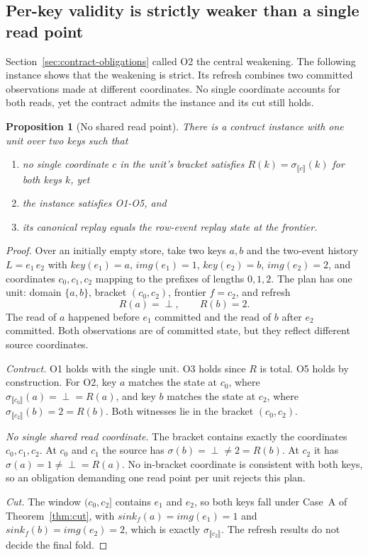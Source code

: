 \documentclass[sigconf,nonacm,10pt]{acmart}
\theoremstyle{plain}
\newtheorem{proposition}{Proposition}
\theoremstyle{definition}
\newcommand{\den}[1]{\llbracket #1 \rrbracket}   %
\newcommand{\window}[2]{(#1,#2]}                 %
\newcommand{\keyof}{\mathit{key}}                %
\newcommand{\imgof}{\mathit{img}}                %
\newcommand{\sink}{\mathit{sink}}                %
\begin{document}
\subsection{Per-key validity is strictly weaker than a single read
point}\label{sec:theorem-torn}

Section~\ref{sec:contract-obligations} called O2 the central weakening. The
following instance shows that the weakening is strict. Its refresh
combines two committed observations made at different coordinates. No
single coordinate accounts for both reads, yet the contract admits
the instance and its cut still holds.

\begin{proposition}[No shared read point]\label{prop:torn}
There is a contract instance with one unit over two keys such that
\begin{enumerate}
\item no single coordinate $c$ in the unit's bracket satisfies
$R(k) = \sigma_{\den{c}}(k)$ for both keys $k$, yet
\item the instance satisfies O1-O5, and
\item its canonical replay equals the row-event replay state at the frontier.
\end{enumerate}
\end{proposition}

\begin{proof}
Over an initially empty store, take two keys $a, b$ and the
two-event history $L = e_1\, e_2$ with $\keyof(e_1) = a$,
$\imgof(e_1) = 1$, $\keyof(e_2) = b$, $\imgof(e_2) = 2$, and
coordinates $c_0, c_1, c_2$ mapping to the prefixes of lengths $0, 1,
2$. The plan has one unit: domain $\{a, b\}$, bracket $(c_0, c_2)$,
frontier $f = c_2$, and refresh
\[
R(a) = \perp, \qquad R(b) = 2.
\]
The read of $a$ happened before $e_1$ committed and the read of $b$
after $e_2$ committed. Both observations are of committed state, but
they reflect different source coordinates.

\emph{Contract.} O1 holds with the single unit. O3 holds since $R$
is total. O5 holds by construction. For O2, key $a$ matches the 
state at $c_0$, where $\sigma_{\den{c_0}}(a) = \perp = R(a)$, and key $b$ 
matches the state at $c_2$, where $\sigma_{\den{c_2}}(b) = 2 = R(b)$. Both
witnesses lie in the bracket $(c_0, c_2)$.

\emph{No single shared read coordinate.} The bracket contains exactly the
coordinates $c_0, c_1, c_2$. At $c_0$ and $c_1$ the source has
$\sigma(b) = \perp \neq 2 = R(b)$. At $c_2$ it has
$\sigma(a) = 1 \neq \perp = R(a)$. No in-bracket coordinate is
consistent with both keys, so an obligation demanding one read point per
unit rejects this plan.

\emph{Cut.} The window $\window{c_0}{c_2}$ contains $e_1$ and
$e_2$, so both keys fall under Case~A of Theorem~\ref{thm:cut},
with $\sink_f(a) = \imgof(e_1) = 1$ and $\sink_f(b) = \imgof(e_2) = 2$,
which is exactly $\sigma_{\den{c_2}}$. The refresh results do not
decide the final fold.
\end{proof}
\end{document}
